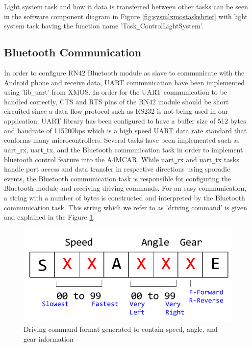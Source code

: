Light system task and how it data is transferred between other tasks can be seen in the software component diagram in Figure \ref{fig:sysmlxmostasksbrief} with light system task having the function name 'Task\texttt{\_}ControlLightSystem'.

\subsection{Bluetooth Communication}
In order to configure RN42 Bluetooth module \cite{rn42datasheet} as slave to communicate with the Android phone and receive data, UART communication have been implemented using 'lib\texttt{\_}uart' from XMOS. In order for the UART communication to be handled correctly, CTS and RTS pins of the RN42 module should be short circuited since a data flow protocol such as RS232 is not being used in our application. UART library has been configured to have a buffer size of 512 bytes and baudrate of 115200bps which is a high speed UART data rate standard that conforms many microcontrollers. Several tasks have been implemented such as uart\texttt{\_}rx, uart\texttt{\_}tx, and the Bluetooth communication task in order to implement bluetooth control feature into the A4MCAR. While uart\texttt{\_}rx and uart\texttt{\_}tx tasks handle port access and data transfer in respective directions using sporadic events, the Bluetooth communication task is responsible for configuring the Bluetooth module and receiving driving commands. For an easy communication, a string with a number of bytes is constructed and interpreted by the Bluetooth communication task. This string which we refer to as 'driving command' is given and explained in the Figure \ref{fig:bluetoothcommand}. 
\begin{figure}[!ht]
	\includegraphics[scale=0.6]{content/images/bluetoothcommand.png}
	\caption{Driving command format generated to contain speed, angle, and gear information}
	\label{fig:bluetoothcommand}
\end{figure}
